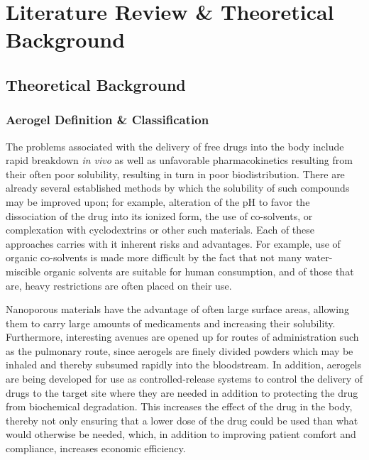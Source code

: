 \documentclass[a4paper,12pt]{article}
\begin{document}
\pagebreak

\section{Literature Review \& Theoretical Background}

\subsection{Theoretical Background}

\subsubsection{Aerogel Definition \& Classification}

The problems associated with the delivery of free drugs into the body include rapid breakdown \textit{in vivo} as well as unfavorable pharmacokinetics resulting from their often poor solubility, resulting in turn in poor biodistribution.\supercite{maleki_synthesis_2016} There are already several established methods by which the solubility of such compounds may be improved upon; for example, alteration of the pH to favor the dissociation of the drug into its ionized form, the use of co-solvents, or complexation with cyclodextrins or other such materials. Each of these approaches carries with it inherent risks and advantages. For example, use of organic co-solvents is made more difficult by the fact that not many water-miscible organic solvents are suitable for human consumption, and of those that are, heavy restrictions are often placed on their use.\supercite{aulton_aultons_2013}

Nanoporous materials have the advantage of often large surface areas, allowing them to carry large amounts of medicaments and increasing their solubility. Furthermore, interesting avenues are opened up for routes of administration such as the pulmonary route, since aerogels are finely divided powders which may be inhaled and thereby subsumed rapidly into the bloodstream. In addition, aerogels are being developed for use as controlled-release systems to control the delivery of drugs to the target site where they are needed in addition to protecting the drug from biochemical degradation. This increases the effect of the drug in the body, thereby not only ensuring that a lower dose of the drug could be used than what would otherwise be needed, which, in addition to improving patient comfort and compliance, increases economic efficiency.\supercite{vallet-regi_mesoporous_2007}
\end{document}
